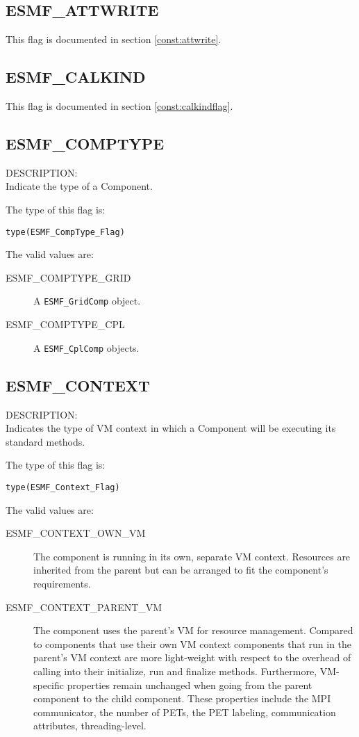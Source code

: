 \subsection{ESMF\_ATTWRITE}
This flag is documented in section \ref{const:attwrite}.

\subsection{ESMF\_CALKIND}
This flag is documented in section \ref{const:calkindflag}.

\subsection{ESMF\_COMPTYPE}
\label{const:comptype}
{\sf DESCRIPTION:\\}
Indicate the type of a Component.

The type of this flag is:

{\tt type(ESMF\_CompType\_Flag)}

The valid values are:
\begin{description}
	\item[ESMF\_COMPTYPE\_GRID]
	A {\tt ESMF\_GridComp} object. 
	\item[ESMF\_COMPTYPE\_CPL]
	A {\tt ESMF\_CplComp} objects.
\end{description}


\subsection{ESMF\_CONTEXT}
\label{const:contextflag}
{\sf DESCRIPTION:\\}  
Indicates the type of VM context in which a Component will be executing its
standard methods.

The type of this flag is:

{\tt type(ESMF\_Context\_Flag)}

The valid values are:
\begin{description}

\item [ESMF\_CONTEXT\_OWN\_VM]
         The component is running in its own, separate VM context. Resources
         are inherited from the parent but can be arranged to fit the
         component's requirements.
\item [ESMF\_CONTEXT\_PARENT\_VM]
         The component uses the parent's VM for resource management. Compared
         to components that use their own VM context components that run in the
         parent's VM context are more light-weight with respect to the overhead
         of calling into their initialize, run and finalize methods.
         Furthermore, VM-specific properties remain unchanged when going from
         the parent component to the child component. These properties include
         the MPI communicator, the number of PETs, the PET labeling, 
         communication attributes, threading-level.
\end{description}

